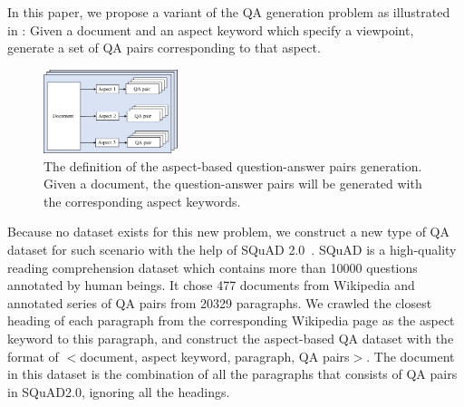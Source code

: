 

In this paper, we propose a variant of the QA generation problem as
illustrated in :
Given a document and an aspect keyword which specify a viewpoint, 
generate a set of QA pairs corresponding to that aspect.

\begin{figure}[th]
	\centering
	\includegraphics[width=0.35\textwidth]{pic/process.pdf}
	\caption{\label{fig:process} The definition of the aspect-based 
question-answer pairs generation. 
Given a document, the question-answer pairs will be generated 
with the corresponding aspect keywords. 
} 
\end{figure}


Because no dataset exists for this new problem, we construct 
a new type of QA dataset for such scenario with the help of 
SQuAD 2.0~\cite{rajpurkar2018know}. 
SQuAD is a high-quality reading comprehension dataset which contains more than 10000 questions annotated by human beings. 
It chose 477 documents from Wikipedia and annotated series of QA pairs from 20329 paragraphs.
We crawled the closest heading of each paragraph from the corresponding Wikipedia page as the aspect keyword to this paragraph, and construct the aspect-based QA dataset with the format of $<$document, aspect keyword, paragraph, QA pairs$>$.
The document in this dataset is the combination of all the paragraphs that consists of QA pairs in SQuAD2.0, ignoring all the headings.


